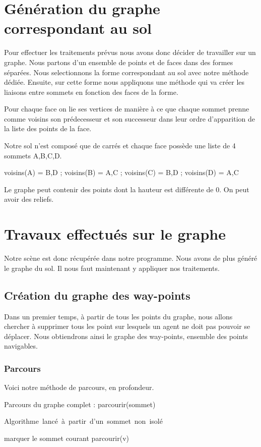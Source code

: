 \documentclass[a4paper,12pt]{report}
\begin{document}
\section{Génération du graphe correspondant au sol}

Pour effectuer les traitements prévus nous avons donc décider de travailler sur un graphe. Nous partons d'un ensemble de points et de faces dans des formes séparées. Nous selectionnons la forme correspondant au sol avec notre méthode dédiée. Ensuite, sur cette forme nous appliquons une méthode qui va créer les liaisons entre sommets en fonction des faces de la forme. 

Pour chaque face on lie ses vertices de manière à ce que chaque sommet prenne comme voisins son prédecesseur et son successeur dans leur ordre d'apparition de la liste des points de la face.

Notre sol n'est composé que de carrés et chaque face possède une liste de 4 sommets A,B,C,D.

voisins(A) = {B,D} ;  voisins(B) = {A,C} ; voisins(C) = {B,D} ; voisins(D) = {A,C}

Le graphe peut contenir des points dont la hauteur est différente de 0. On peut avoir des reliefs.


\section{Travaux effectués sur le graphe}

Notre scène est donc récupérée dans notre programme. Nous avons de plus généré le graphe du sol. Il nous faut maintenant y appliquer nos traitements.

\subsection{Création du graphe des way-points}

Dans un premier temps, à partir de tous les points du graphe, nous allons chercher à supprimer tous les point sur lesquels un agent ne doit pas pouvoir se déplacer. Nous obtiendrons ainsi le graphe des way-points, ensemble des points navigables.

\subsubsection{Parcours}

Voici notre méthode de parcours, en profondeur. 

\begin{algorithm}[h]
\caption{Parcours du graphe complet : parcourir(sommet)}
\label{parcours_graphe}
\mbox{Algorithme lancé à partir d'un sommet non isolé}
\begin{algorithmic}[1]
  \STATE marquer le sommet courant
    \STATE parcourir(v)
  \ENDFOR
\ENDIF
\end{algorithmic}
\end{algorithm}
\end{document}
